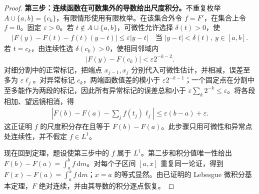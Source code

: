 \documentclass[../../main.tex]{subfiles}%
\begin{document}
\begin{proof}
\textbf{第三步：连续函数在可数集外的导数给出尺度积分。}不重复枚举 $A\cup\{a,b\}=\{c_k\}$，有限情形使用有限枚举。在该集合外令 $f=F'$，在集合上令 $f=0$。固定 $\varepsilon>0$。若 $t\notin A\cup\{a,b\}$，可微性允许选择 $\delta(t)>0$，使
\begin{align*}
|F(y)-F(t)-f(t)(y-t)|\le\varepsilon|y-t|
\quad\text{当 } |y-t|<\delta(t),\ y\in[a,b].
\end{align*}
若 $t=c_k$，由连续性选 $\delta(c_k)>0$，使相同邻域内
\begin{align*}
|F(y)-F(c_k)|<\varepsilon 2^{-k-2}.
\end{align*}
对细分割中的正常标记，把端点 $x_{j-1},x_j$ 分别代入可微性估计，并相减，误差至多为 $\varepsilon\ell_j$。对异常标记 $c_k$，两端函数值差的模小于 $\varepsilon2^{-k-1}$；一个固定点在分割中至多能作为两段的标记，因此所有异常标记的误差总和小于 $\varepsilon\sum_k2^{-k}\le\varepsilon$。将各段相加、望远镜相消，得
\begin{align*}
\left|F(b)-F(a)-\sum_jf(t_j)\ell_j\right|
\le\varepsilon(b-a)+\varepsilon.
\end{align*}
这正证明 $f$ 的尺度积分存在且等于 $F(b)-F(a)$。此步骤只用可微性和异常点处连续性，并不假定 $f\in L^1$。

现在回到定理，题设使第三步中的 $f$ 属于 $L^1$。第二步和积分值唯一性给出 $F(b)-F(a)=\int_a^bf\,\mathrm dm$。对每个子区间 $[a,x]$ 重复同一论证，得到 $F(x)-F(a)=\int_a^xf\,\mathrm dm$；$x=a$ 的等式显然。由已证明的 Lebesgue 微积分基本定理，$F$ 绝对连续，并由其导数的积分逐点恢复。
\end{proof}
\end{document}
